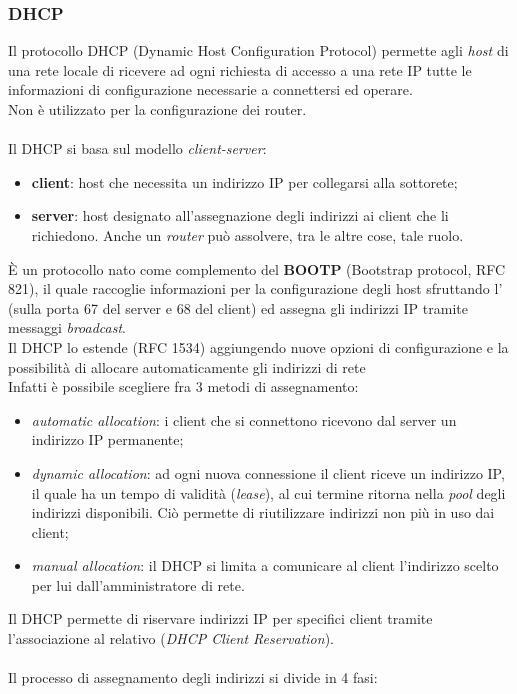 \documentclass[a4paper,11pt]{article}
\def\subsub#1{\subsubsection{#1}\label{#1}}
\def\vedi#1{\nameref{#1}}
\def\italic#1{\textit{#1}}
\begin{document}
\subsub{DHCP} %
Il protocollo DHCP (Dynamic Host Configuration Protocol) permette agli \italic{host} di una rete locale di ricevere ad ogni richiesta di accesso a una rete IP tutte le informazioni di configurazione necessarie a connettersi ed operare.
\\Non è utilizzato per la configurazione dei router.
\\\\  Il DHCP si basa sul modello \italic{client-server}:
\begin{itemize}
	\item \textbf{client}:  host che necessita un indirizzo IP per collegarsi alla sottorete;
	\item \textbf{server}:  host designato all'assegnazione degli indirizzi ai client che li richiedono. Anche un \italic{router} può assolvere, tra le altre cose, tale ruolo.
\end{itemize}
È un protocollo nato come complemento del \textbf{BOOTP} (Bootstrap protocol, RFC 821), il quale raccoglie informazioni per la configurazione degli host sfruttando l'\vedi{UDP} (sulla porta 67 del server e 68 del client) ed assegna gli indirizzi IP tramite messaggi \italic{broadcast}.
\\Il DHCP lo estende (RFC 1534) aggiungendo nuove opzioni di configurazione e la possibilità di allocare automaticamente gli indirizzi di rete
\\Infatti è possibile scegliere fra 3 metodi di assegnamento:
\begin{itemize}
	\item \italic{automatic allocation}: i client che si connettono ricevono dal server un indirizzo IP permanente;
	\item \italic{dynamic allocation}: ad ogni nuova connessione il client riceve un indirizzo IP, il quale ha un tempo di validità (\italic{lease}), al cui termine ritorna nella \italic{pool} degli indirizzi disponibili. Ciò permette di riutilizzare indirizzi non più in uso dai client;
	\item \italic{manual allocation}: il DHCP si limita a comunicare al client l'indirizzo scelto per lui dall'amministratore di rete.
\end{itemize}
Il DHCP permette di riservare indirizzi IP per specifici client tramite l'associazione al relativo \vedi{Indirizzo MAC} (\italic{DHCP Client Reservation}).
\\\\Il processo di assegnamento degli indirizzi si divide in 4 fasi:
\end{document}
